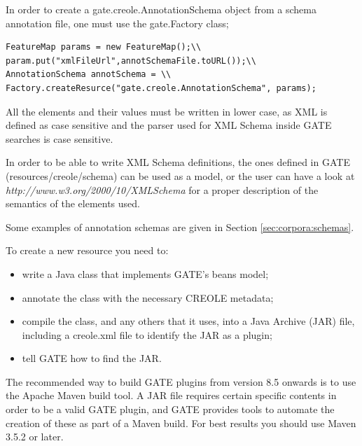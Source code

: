 In order to create a gate.creole.AnnotationSchema object from a
schema annotation file, one must use the gate.Factory class;

\begin{lstlisting}
FeatureMap params = new FeatureMap();\\
param.put("xmlFileUrl",annotSchemaFile.toURL());\\
AnnotationSchema annotSchema = \\
Factory.createResurce("gate.creole.AnnotationSchema", params);
\end{lstlisting}

 All the elements and their values must be written
in lower case, as XML is defined as case sensitive and the parser used
for XML Schema inside GATE searches is case sensitive.

In order to be able to write XML Schema definitions, the ones defined in
GATE (resources/creole/schema) can be used as a model, or the user can
have a look at {\em http://www.w3.org/2000/10/XMLSchema} for a
proper description of the semantics of the elements used.

Some examples of annotation schemas are given in Section \ref{sec:corpora:schemas}.



To create a new resource you need to:

%
\begin{itemize}
\item
write a Java class that implements GATE's beans model;
\item
annotate the class with the necessary CREOLE metadata;
\item
compile the class, and any others that it uses, into a Java Archive (JAR)
file, including a creole.xml file to identify the JAR as a plugin;
\item
tell GATE how to find the JAR.
\end{itemize}
%
The recommended way to build GATE plugins from version 8.5 onwards is to use
the Apache Maven build tool.  A JAR file requires certain specific contents in
order to be a valid GATE plugin, and GATE provides tools to automate the
creation of these as part of a Maven build.  For best results you should use
Maven 3.5.2 or later.

